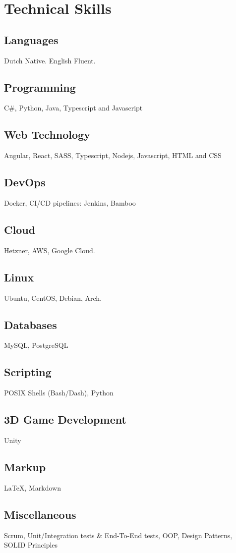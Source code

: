 \pagebreak
\section{Technical Ski\textcolor{mycolor}{lls}}
  \subsection{Languages} 
  Dutch \textcolor{mycolor}{Native}. English \textcolor{mycolor}{Fluent}.
  \subsection{Programming}
    C\#, Python, Java, Typescript and Javascript
  \subsection{Web Technology}
    Angular, React, SASS, Typescript, Nodejs, Javascript, HTML and CSS
  \subsection{DevOps}
    Docker, CI/CD pipelines: Jenkins, Bamboo
  \subsection{Cloud}
    Hetzner, AWS, Google Cloud.
  \subsection{Linux}
    Ubuntu, CentOS, Debian, Arch.
  \subsection{Databases}
    MySQL, PostgreSQL
  \subsection{Scripting}
    POSIX Shells (Bash/Dash), Python
  \subsection{3D Game Development}
    Unity
  \subsection{Markup}
    {\LaTeX}, Markdown
  \subsection{Miscellaneous}
    Scrum, Unit/Integration tests \& End-To-End tests, OOP, Design Patterns, SOLID Principles